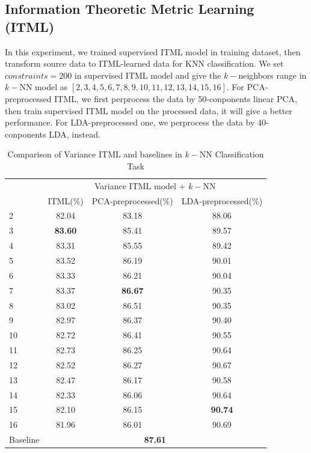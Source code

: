 \documentclass[conference]{IEEEtran}
\begin{document}
\subsection{Information Theoretic Metric Learning (ITML)}

In this experiment, we trained supervised ITML model in training dataset, then transform source data to ITML-learned data for KNN classification. We set $constraints=200$ in supervised ITML model and give the $k-$neighbors range in $k-$NN model as $[2, 3, 4, 5, 6, 7, 8, 9, 10, 11, 12, 13, 14, 15, 16]$. For PCA-preprocessed ITML, we first perprocess the data by 50-conponents linear PCA, then train supervised ITML model on the processed data, it will give a better performance. For LDA-preprocessed one, we perprocess the data by 40-conponents LDA, instead.

\begin{table}[htbp]
	\centering
 	\newcommand{\tabincell}[2]{\begin{tabular}{@{}#1@{}}#2\end{tabular}}
 	\renewcommand\arraystretch{1.0}
 	\caption{Comparison of Variance ITML and baselines in $k-$NN Classification Task}
 	\label{base2}%
 		\begin{tabular}{@{}p{1cm}<{\centering}|c|c|c}
 		\hline
 		\multirow{2}{*}{\diagbox[height=2\line,width=1.42cm,font=\tiny]{$k$}{Acc.}{$\mathit{M}$}} &
 		\multicolumn{3}{c}{Variance ITML model + $k-$NN}\\
 		\cline{2-4}
 		& {ITML(\%)} & {PCA-preprocessed(\%)} & {LDA-preprocessed(\%)}\\
 		\hline
 		2   & 82.04 & 83.18 & 88.06\\
 		3   & \textbf{83.60} & 85.41 & 89.57\\
 		4   & 83.31 & 85.55 & 89.42\\
 		5   & 83.52  & 86.19 & 90.01\\
 		6   & 83.33  & 86.21 & 90.04\\
 		7   & 83.37  & \textbf{86.67} & 90.35\\
 		8   & 83.02  & 86.51 & 90.35\\
 		9   & 82.97  & 86.37 & 90.40\\
 		10   & 82.72  & 86.41 & 90.55\\
 		11   & 82.73  & 86.25 & 90.64\\
 		12   & 82.52  & 86.27 & 90.67\\
 		13   & 82.47  & 86.17 & 90.58\\
 		14   & 82.33  & 86.06 & 90.64\\
 		15   & 82.10  & 86.15 & \textbf{90.74}\\
		16   & 81.96  & 86.01 & 90.69\\
		\hline
 		Baseline & \multicolumn{3}{c}{\textbf{87.61}} \\
 		\hline
 	\end{tabular}
\end{table}
\end{document}
